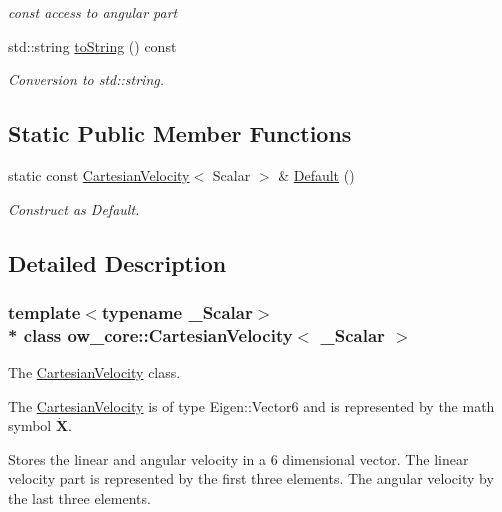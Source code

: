 \begin{DoxyCompactItemize}
\begin{DoxyCompactList}\small\item\em const access to angular part \end{DoxyCompactList}\item 
std\+::string \hyperlink{classow__core_1_1CartesianVelocity_ae78d83f858be0085a2d564a84aa32722}{to\+String} () const \hypertarget{classow__core_1_1CartesianVelocity_ae78d83f858be0085a2d564a84aa32722}{}\label{classow__core_1_1CartesianVelocity_ae78d83f858be0085a2d564a84aa32722}

\begin{DoxyCompactList}\small\item\em Conversion to std\+::string. \end{DoxyCompactList}\end{DoxyCompactItemize}
\subsection*{Static Public Member Functions}
\begin{DoxyCompactItemize}
\item 
static const \hyperlink{classow__core_1_1CartesianVelocity}{Cartesian\+Velocity}$<$ Scalar $>$ \& \hyperlink{classow__core_1_1CartesianVelocity_ab9823aafa0100aa054396668a32324c1}{Default} ()
\begin{DoxyCompactList}\small\item\em Construct as Default. \end{DoxyCompactList}\end{DoxyCompactItemize}


\subsection{Detailed Description}
\subsubsection*{template$<$typename \+\_\+\+Scalar$>$\\*
class ow\+\_\+core\+::\+Cartesian\+Velocity$<$ \+\_\+\+Scalar $>$}

The \hyperlink{classow__core_1_1CartesianVelocity}{Cartesian\+Velocity} class. 

The \hyperlink{classow__core_1_1CartesianVelocity}{Cartesian\+Velocity} is of type Eigen\+::\+Vector6 and is represented by the math symbol $\dot{\mathbf{X}}$.

Stores the linear and angular velocity in a 6 dimensional vector. The linear velocity part is represented by the first three elements. The angular velocity by the last three elements. 

